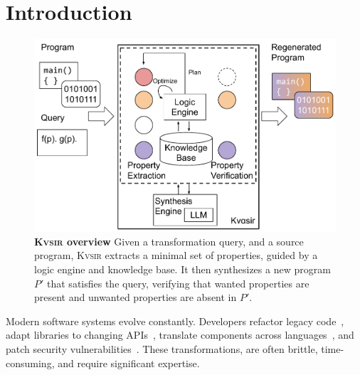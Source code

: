 \documentclass[noacm,sigplan,review]{acmart}
\newcommand{\sys}{{\scshape Kv{\textalpha}sir}\xspace}
\begin{document}
\section{Introduction}
\begin{figure}[t]
  \includegraphics[width=\columnwidth]{figs/kvasir_overview.pdf}
  \caption{\textbf{\sys overview}
Given a transformation query, and a source program, \sys extracts a minimal set
  of properties,
  guided by a logic engine and knowledge base.
  It then synthesizes a new program $P'$ that satisfies the query, verifying
  that wanted properties are present and unwanted properties are absent in $P'$.
}
  \label{fig:overview}
\end{figure}





Modern software systems evolve constantly.
Developers refactor legacy code~\cite{Fowler99,Mens04,facebook2010redesigns,dropbox2014syncengine},
adapt libraries to changing APIs~\cite{dig2005role,kula2017empiricalstudyimpactrefactoring},
translate components across languages~\cite{manzoor_cli_python,gaultier_rewrite_cpp},
and patch security vulnerabilities~\cite{ikegami2022userefactoringsecurityvulnerability,schneier2013security_vulnerabilities}.
These transformations, are often brittle, time-consuming, and require significant expertise.
\end{document}

